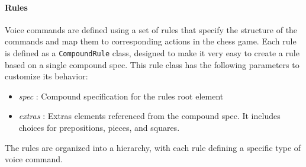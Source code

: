 \documentclass[a4paper, 11pt, twocolumn]{IEEEtran}
\begin{document}
    
    \paragraph*{Rules} Voice commands are defined using a set of rules that specify the structure of the commands and map them to corresponding actions in the chess game. Each rule is defined as a \texttt{CompoundRule} class, designed to make it very easy to create a rule based on a single compound spec. This rule class has the following parameters to customize its behavior:
    \begin{itemize}
        \item \emph{spec} : Compound specification for the rules root element 
        \item \emph{extras} : Extras elements referenced from the compound spec. It includes choices for prepositions, pieces, and squares.
    \end{itemize}
    The rules are organized into a hierarchy, with each rule defining a specific type of voice command. 
        
\end{document}

